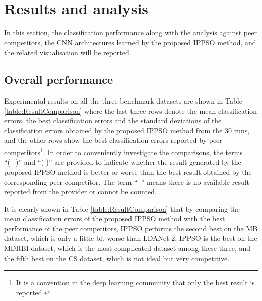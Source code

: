 \documentclass[conference]{IEEEtran}
\begin{document}
\section{Results and analysis}\label{sec:EPResults}

In this section, the classification performance along with the analysis against peer competitors, the CNN architectures learned by the proposed IPPSO method, and the related visualisation will be reported. 



\subsection{Overall performance}\label{sec:Performance}

Experimental results on all the three benchmark datasets are shown in Table \ref{table:ResultComparison} where the last three rows denote the mean classification errors, the best classification errors and the standard deviations of the classification errors obtained by the proposed IPPSO method from the 30 runs, and the other rows show the best classification errors reported by peer competitors\footnote{It is a convention in the deep learning community that only the best result is reported.}. In order to conveniently investigate the comparisons, the terms “(+)” and “(-)” are provided to indicate whether the result generated by the proposed IPPSO method is better or worse than the best result obtained by the corresponding peer competitor. The term “--” means there is no available result reported from the provider or cannot be counted.


It is clearly shown in Table \ref{table:ResultComparison} that by comparing the mean classification errors of the proposed IPPSO method with the best performance of the peer competitors, IPPSO performs the second best on the MB dataset, which is only a little bit worse than LDANet-2. IPPSO is the best on the MDRBI dataset, which is the most complicated dataset among these three, and the fifth best on the CS dataset, which is not ideal but very competitive. 
\end{document}
